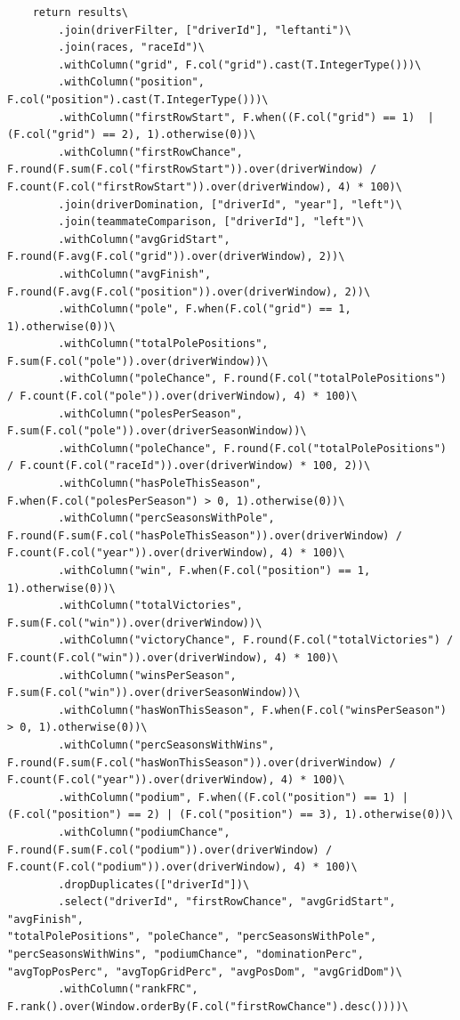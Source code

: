 \documentclass[12pt,twoside,titlepage]{report}
\begin{document}
\begin{lstlisting}
	return results\
		.join(driverFilter, ["driverId"], "leftanti")\
		.join(races, "raceId")\
		.withColumn("grid", F.col("grid").cast(T.IntegerType()))\
		.withColumn("position", F.col("position").cast(T.IntegerType()))\
		.withColumn("firstRowStart", F.when((F.col("grid") == 1)  | (F.col("grid") == 2), 1).otherwise(0))\
		.withColumn("firstRowChance", F.round(F.sum(F.col("firstRowStart")).over(driverWindow) / F.count(F.col("firstRowStart")).over(driverWindow), 4) * 100)\
		.join(driverDomination, ["driverId", "year"], "left")\
		.join(teammateComparison, ["driverId"], "left")\
		.withColumn("avgGridStart", F.round(F.avg(F.col("grid")).over(driverWindow), 2))\
		.withColumn("avgFinish", F.round(F.avg(F.col("position")).over(driverWindow), 2))\
		.withColumn("pole", F.when(F.col("grid") == 1, 1).otherwise(0))\
		.withColumn("totalPolePositions", F.sum(F.col("pole")).over(driverWindow))\
		.withColumn("poleChance", F.round(F.col("totalPolePositions") / F.count(F.col("pole")).over(driverWindow), 4) * 100)\
		.withColumn("polesPerSeason", F.sum(F.col("pole")).over(driverSeasonWindow))\
		.withColumn("poleChance", F.round(F.col("totalPolePositions") / F.count(F.col("raceId")).over(driverWindow) * 100, 2))\
		.withColumn("hasPoleThisSeason", F.when(F.col("polesPerSeason") > 0, 1).otherwise(0))\
		.withColumn("percSeasonsWithPole", F.round(F.sum(F.col("hasPoleThisSeason")).over(driverWindow) / F.count(F.col("year")).over(driverWindow), 4) * 100)\
		.withColumn("win", F.when(F.col("position") == 1, 1).otherwise(0))\
		.withColumn("totalVictories", F.sum(F.col("win")).over(driverWindow))\
		.withColumn("victoryChance", F.round(F.col("totalVictories") / F.count(F.col("win")).over(driverWindow), 4) * 100)\
		.withColumn("winsPerSeason", F.sum(F.col("win")).over(driverSeasonWindow))\
		.withColumn("hasWonThisSeason", F.when(F.col("winsPerSeason") > 0, 1).otherwise(0))\
		.withColumn("percSeasonsWithWins", F.round(F.sum(F.col("hasWonThisSeason")).over(driverWindow) / F.count(F.col("year")).over(driverWindow), 4) * 100)\
		.withColumn("podium", F.when((F.col("position") == 1) | (F.col("position") == 2) | (F.col("position") == 3), 1).otherwise(0))\
		.withColumn("podiumChance", F.round(F.sum(F.col("podium")).over(driverWindow) / F.count(F.col("podium")).over(driverWindow), 4) * 100)\
		.dropDuplicates(["driverId"])\
		.select("driverId", "firstRowChance", "avgGridStart", "avgFinish", 
"totalPolePositions", "poleChance", "percSeasonsWithPole", 
"percSeasonsWithWins", "podiumChance", "dominationPerc", 
"avgTopPosPerc", "avgTopGridPerc", "avgPosDom", "avgGridDom")\
		.withColumn("rankFRC", F.rank().over(Window.orderBy(F.col("firstRowChance").desc())))\

\end{lstlisting}
\end{document}
